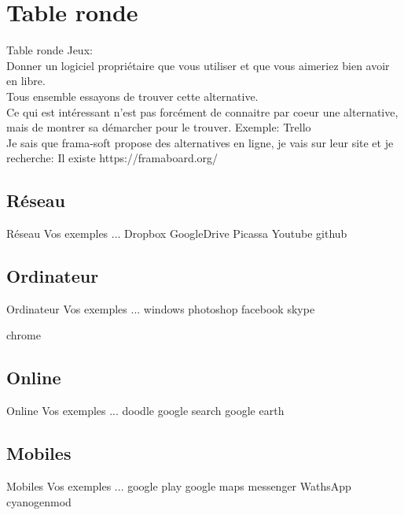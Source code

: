 \documentclass{beamer}
\begin{document}

\section{Table ronde}
\begin{frame}{Table ronde}
Jeux:\\
	Donner un logiciel propriétaire que vous utiliser et que vous aimeriez bien avoir en libre.\\
	Tous ensemble essayons de trouver cette alternative.\\
	Ce qui est intéressant n'est pas forcément de connaitre par coeur une alternative, mais de montrer sa démarcher pour le trouver.\newline
	\newline
	Exemple: Trello\\
	Je sais que frama-soft propose des alternatives en ligne, je vais sur leur site et je recherche: Il existe https://framaboard.org/
\end{frame}

\subsection{Réseau}
\begin{frame}{Réseau}
Vos exemples ...
Dropbox GoogleDrive
Picassa
Youtube
github
\end{frame}

\subsection{Ordinateur}
\begin{frame}{Ordinateur}
Vos exemples ...
windows
photoshop
facebook
skype

chrome
\end{frame}

\subsection{Online}
\begin{frame}{Online}
Vos exemples ...
doodle
google search
google earth
\end{frame}

\subsection{Mobiles}
\begin{frame}{Mobiles} 
Vos exemples ...
google play
google maps
messenger
WathsApp
cyanogenmod
\end{frame}
\end{document}
